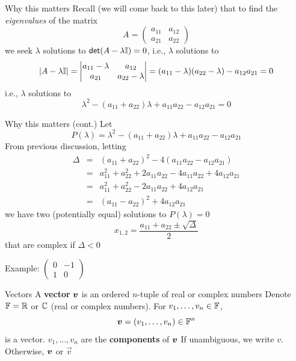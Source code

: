 \documentclass[aspectratio=169]{beamer}\usepackage[]{graphicx}\usepackage[]{xcolor}
\begin{document}
\begin{frame}{Why this matters}
Recall (we will come back to this later) that to find the \emph{eigenvalues} of the matrix
\[
A=
\begin{pmatrix}
a_{11} & a_{12} \\ a_{21} & a_{22}
\end{pmatrix}
\]
we seek $\lambda$ solutions to $\mathsf{det}(A-\lambda\mathbb{I})=0$, i.e., $\lambda$ solutions to
\[
|A-\lambda\mathbb{I}|
=\left|
\begin{matrix}
a_{11}-\lambda & a_{12} \\ a_{21} & a_{22}-\lambda
\end{matrix}
\right|
=(a_{11}-\lambda)(a_{22}-\lambda)-a_{12}a_{21}=0
\]
i.e., $\lambda$ solutions to
\[
\lambda^2 - (a_{11}+a_{22})\lambda + a_{11}a_{22}-a_{12}a_{21} = 0
\]
\end{frame}

\begin{frame}{Why this matters (cont.)}
Let
\[
P(\lambda) = \lambda^2 - (a_{11}+a_{22})\lambda + a_{11}a_{22}-a_{12}a_{21}
\]
From previous discussion, letting 
\[
\begin{matrix} 
\Delta &=& (a_{11}+a_{22})^2-4(a_{11}a_{22}-a_{12}a_{21}) \\
&=& a_{11}^2+a_{22}^2+2a_{11}a_{22}
-4a_{11}a_{22}+4a_{12}a_{21} \\
&=& a_{11}^2+a_{22}^2-2a_{11}a_{22}
+4a_{12}a_{21} \\
&=& (a_{11}-a_{22})^2+4a_{12}a_{21}
\end{matrix}
\]
we have two (potentially equal) solutions to $P(\lambda)=0$
\[
x_{1,2} = \frac{a_{11}+a_{22}\pm \sqrt{\Delta}}{2}
\]
that are complex if $\Delta<0$

Example:
$\begin{pmatrix}
0 & -1 \\ 1 & 0
\end{pmatrix}$

\end{frame}


\begin{frame}{Vectors}
	A \textbf{vector} $\bm{v}$ is an ordered $n$-tuple of real or complex numbers
	\vfill 
	Denote $\mathbb{F}=\mathbb{R}$ or $\mathbb{C}$ (real or complex numbers). 
	For
	$v_1,\ldots,v_n\in\mathbb{F}$, 
	\[
	\bm{v}=(v_1,\ldots,v_n)\in\mathbb{F}^n
	\]
	is a vector. $v_1,\ldots,v_n$ are the \textbf{components} of $\bm{v}$
	\vfill
	If unambiguous, we write $v$. Otherwise, $\bm{v}$ or $\vec{v}$
\end{frame}
\end{document}
